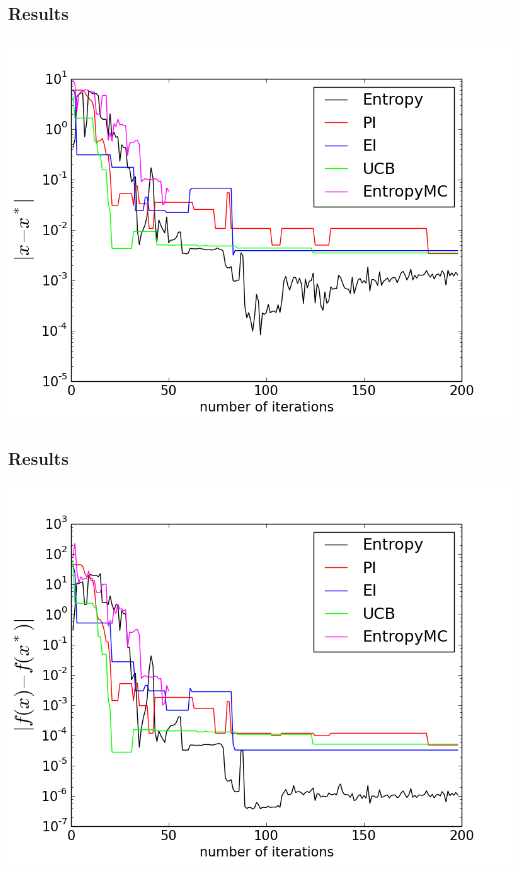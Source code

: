 \documentclass[10pt,handout]{beamer}
\begin{document}
\begin{frame}
\frametitle{Results}

\includegraphics[width=\textwidth]{plot_branin2.png}

\end{frame}


\begin{frame}
\frametitle{Results}

\includegraphics[width=\textwidth]{plot_branin1.png}

\end{frame}
\end{document}
